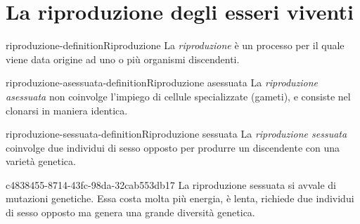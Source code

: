 \documentclass[preview]{standalone}
\begin{document}
\genpage

\section{La riproduzione degli esseri viventi}

\begin{snippetdefinition}{riproduzione-definition}{Riproduzione}
    La \textit{riproduzione} è un processo per il quale viene data origine ad uno o più organismi
    discendenti.
\end{snippetdefinition}

\begin{snippetdefinition}{riproduzione-asessuata-definition}{Riproduzione asessuata}
    La \textit{riproduzione asessuata} non coinvolge l'impiego di cellule specializzate (gameti),
    e consiste nel clonarsi in maniera identica.
\end{snippetdefinition}


\begin{snippetdefinition}{riproduzione-sessuata-definition}{Riproduzione sessuata}
    La \textit{riproduzione sessuata} coinvolge due individui di sesso opposto per produrre un discendente
    con una varietà genetica.
\end{snippetdefinition}

\begin{snippet}{c4838455-8714-43fc-98da-32cab553db17}
    La riproduzione sessuata si avvale di mutazioni genetiche.
    Essa costa molta più energia, è lenta, richiede due individui di sesso opposto ma
    genera una grande diversità genetica.
\end{snippet}
\end{document}
